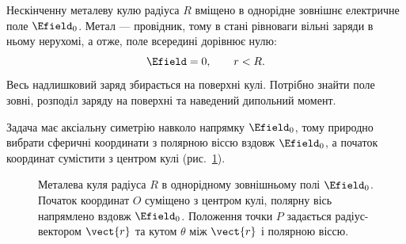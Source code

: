 Нескінченну металеву кулю радіуса $R$ вміщено в однорідне зовнішнє
електричне поле $\Efield_0$. Метал --- провідник, тому в стані
рівноваги вільні заряди в ньому нерухомі, а отже, поле всередині
дорівнює нулю:
\begin{equation*}
    \Efield = 0, \qquad r < R .
\end{equation*}
Весь надлишковий заряд збирається на поверхні кулі. Потрібно знайти
поле зовні, розподіл заряду на поверхні та наведений дипольний момент.

Задача має аксіальну симетрію навколо напрямку $\Efield_0$, тому
природно вибрати сферичні координати з полярною віссю вздовж
$\Efield_0$, а початок координат сумістити з центром кулі (рис.~\ref{fig:sphere_in_field}).

\begin{figure}[h!]
\centering
{}
\caption{Металева куля радіуса $R$ в однорідному зовнішньому полі
$\Efield_0$. Початок координат $O$ суміщено з центром кулі, полярну
вісь напрямлено вздовж $\Efield_0$. Положення точки $P$ задається
радіус-вектором $\vect{r}$ та кутом $\theta$ між $\vect{r}$ і
полярною віссю.}
\label{fig:sphere_in_field}
\end{figure}


